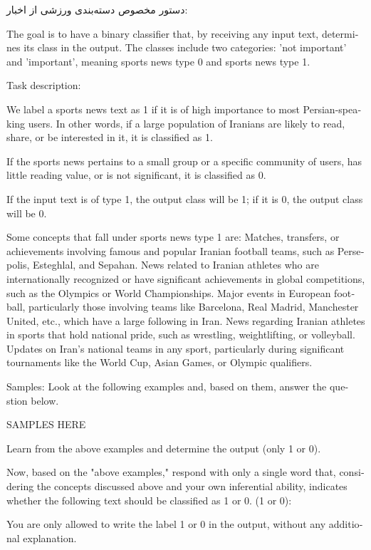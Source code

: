 دستور مخصوص دسته‌بندی ورزشی از اخبار:

\vspace{5pt}
\begin{scriptsize}
\begin{itshape}
\begin{latin}
\LTR
The goal is to have a binary classifier that, by receiving any input text, determines its class in the output. The classes include two categories: 'not important' and 'important', meaning sports news type 0 and sports news type 1.

Task description:

We label a sports news text as 1 if it is of high importance to most Persian-speaking users. In other words, if a large population of Iranians are likely to read, share, or be interested in it, it is classified as 1.

If the sports news pertains to a small group or a specific community of users, has little reading value, or is not significant, it is classified as 0.

If the input text is of type 1, the output class will be 1; if it is 0, the output class will be 0.

Some concepts that fall under sports news type 1 are:
Matches, transfers, or achievements involving famous and popular Iranian football teams, such as Persepolis, Esteghlal, and Sepahan.
News related to Iranian athletes who are internationally recognized or have significant achievements in global competitions, such as the Olympics or World Championships.
Major events in European football, particularly those involving teams like Barcelona, Real Madrid, Manchester United, etc., which have a large following in Iran.
News regarding Iranian athletes in sports that hold national pride, such as wrestling, weightlifting, or volleyball.
Updates on Iran's national teams in any sport, particularly during significant tournaments like the World Cup, Asian Games, or Olympic qualifiers.

Samples: Look at the following examples and, based on them, answer the question below.

SAMPLES HERE

Learn from the above examples and determine the output (only 1 or 0).

Now, based on the "above examples," respond with only a single word that, considering the concepts discussed above and your own inferential ability, indicates whether the following text should be classified as 1 or 0. (1 or 0):

You are only allowed to write the label 1 or 0 in the output, without any additional explanation.
\RTL
\end{latin}
\end{itshape}
\end{scriptsize}
\vspace{5pt}

